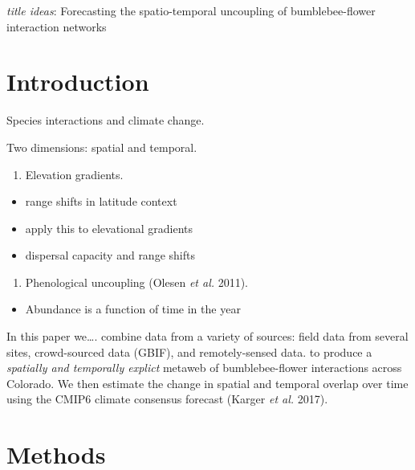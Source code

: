 \documentclass[11pt]{article}
\begin{document}
\vfill

\clearpage
\linenumbers
\pagestyle{normal}

\emph{title ideas}: Forecasting the spatio-temporal uncoupling of
bumblebee-flower interaction networks

\hypertarget{introduction}{%
\section{Introduction}\label{introduction}}

Species interactions and climate change.

Two dimensions: spatial and temporal.

\begin{enumerate}
\def\labelenumi{\arabic{enumi})}
\tightlist
\item
  Elevation gradients.
\end{enumerate}

\begin{itemize}
\tightlist
\item
  range shifts in latitude context
\item
  apply this to elevational gradients
\item
  dispersal capacity and range shifts
\end{itemize}

\begin{enumerate}
\def\labelenumi{\arabic{enumi})}
\setcounter{enumi}{1}
\tightlist
\item
  Phenological uncoupling (Olesen \emph{et al.} 2011).
\end{enumerate}

\begin{itemize}
\tightlist
\item
  Abundance is a function of time in the year
\end{itemize}

In this paper we\ldots. combine data from a variety of sources: field
data from several sites, crowd-sourced data (GBIF), and remotely-sensed
data. to produce a \emph{spatially and temporally explict} metaweb of
bumblebee-flower interactions across Colorado. We then estimate the
change in spatial and temporal overlap over time using the CMIP6 climate
consensus forecast (Karger \emph{et al.} 2017).

\hypertarget{methods}{%
\section{Methods}\label{methods}}
\end{document}
